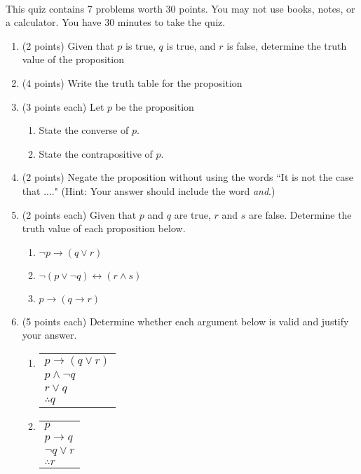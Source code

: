 \documentclass[12pt]{article}
\newcommand{\be}{\begin{enumerate}}
\newcommand{\ee}{\end{enumerate}}
\begin{document}
\thispagestyle{fancy}


\\

\noindent This quiz contains 7 problems worth 30 points. You may not use books, notes, or a calculator. You have 30 minutes to take the quiz.\\

\noindent \hrulefill
\be
\item (2 points) Given that $p$ is true, $q$ is true, and $r$ is false, determine the truth value of the proposition 
\vspace{0.75in}
\item (4 points) Write the truth table for the proposition 
\vspace{3in}
\item (3 points each) Let $p$ be the proposition 
\be
\item State the converse of $p.$
\vspace{0.75in}
\item State the contrapositive of $p.$
\vspace{0.75in}
\ee
\newpage
\item (2 points) Negate the proposition  without using the words ``It is not the case that ...." (Hint: Your answer should include the word \emph{and}.)
\vfill


\item (2 points each) Given that $p$ and $q$ are true, $r$ and $s$ are false. Determine the truth value of each proposition below.
\be
\item $\neg p \rightarrow (q \vee r)$
\vspace{.75in}
\item $\neg(p \vee \neg q) \leftrightarrow (r \wedge s)$
\vspace{.75in}
\item $p \rightarrow (q \rightarrow r)$
\vspace{0.75in}
\ee
\item (5 points each) Determine whether each argument below is valid and justify your answer.
\be
\item \begin{tabular}{l}
$p \rightarrow (q \vee r)$\\
$p \wedge \neg q$\\
$r \vee q$\\
\hline
$\therefore q$
\end{tabular}


\vfill
\item \begin{tabular}{l}
$p$\\
$p \rightarrow q$\\
$\neg q \vee r$\\
\hline
$\therefore r$
\end{tabular}

\vfill
\ee
\ee
\end{document}
